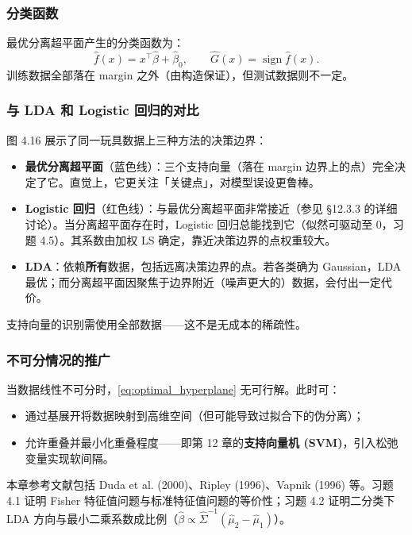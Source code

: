 \subsubsection{分类函数}

最优分离超平面产生的分类函数为：
\begin{equation}\label{eq:optimal_classifier}
    \hat{f}(x) = x^\top \hat{\beta} + \hat{\beta}_0, \qquad
    \hat{G}(x) = \operatorname{sign} \hat{f}(x).
\end{equation}
训练数据全部落在 margin 之外（由构造保证），但测试数据则不一定。

\subsubsection{与 LDA 和 Logistic 回归的对比}

图 4.16 展示了同一玩具数据上三种方法的决策边界：
\begin{itemize}
    \item \textbf{最优分离超平面}（蓝色线）：三个支持向量（落在 margin 边界上的点）完全决定了它。直觉上，它更关注「关键点」，对模型误设更鲁棒。
    \item \textbf{Logistic 回归}（红色线）：与最优分离超平面非常接近（参见 §12.3.3 的详细讨论）。当分离超平面存在时，Logistic 回归总能找到它（似然可驱动至 0，习题 4.5）。其系数由加权 LS 确定，靠近决策边界的点权重较大。
    \item \textbf{LDA}：依赖\textbf{所有}数据，包括远离决策边界的点。若各类确为 Gaussian，LDA 最优；而分离超平面因聚焦于边界附近（噪声更大的）数据，会付出一定代价。
\end{itemize}

支持向量的识别需使用全部数据——这不是无成本的稀疏性。

\subsubsection{不可分情况的推广}

当数据线性不可分时，\eqref{eq:optimal_hyperplane} 无可行解。此时可：
\begin{itemize}
    \item 通过基展开将数据映射到高维空间（但可能导致过拟合下的伪分离）；
    \item 允许重叠并最小化重叠程度——即第 12 章的\textbf{支持向量机 (SVM)}，引入松弛变量实现软间隔。
\end{itemize}

\begin{remark}
本章参考文献包括 Duda et al. (2000)、Ripley (1996)、Vapnik (1996) 等。习题 4.1 证明 Fisher 特征值问题与标准特征值问题的等价性；习题 4.2 证明二分类下 LDA 方向与最小二乘系数成比例（$\hat{\beta} \propto \hat{\Sigma}^{-1}(\hat{\mu}_2 - \hat{\mu}_1)$）。
\end{remark}


